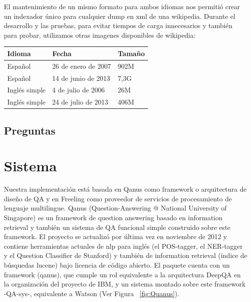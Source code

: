 El mantenimiento de un mismo formato para ambos idiomas nos permitió crear un indexador único para cualquier
dump en xml de una wikipedia. Durante el desarrollo y las pruebas, para evitar tiempos de carga innecesarios y también
para probar, utilizamos otras imagenes disponibles de wikipedia:

\medskip

\begin{center}
\begin{tabular}{ | l | l | l |}
    \hline
    Idioma & Fecha & Tamaño\\ \hline
    Español & 26 de enero de 2007 & 902M \\ \hline
    Español & 14 de junio de 2013 & 7,3G \\ \hline
    Inglés simple & 4 de julio de 2006 & 26M \\ \hline
    Inglés simple & 24 de julio de 2013 & 406M \\ \hline
 \end{tabular}
\end{center}

\subsection{Preguntas}

\section{Sistema}
\label{sec:sistema}
Nuestra implementación está basada en Qanus como framework o arquitectura de diseño de QA y en Freeling como proveedor de servicios de procesamiento de lenguaje multilingue. Qanus (Question-Answering @ National University of Singapore) es un framework de question answering basado en information retrieval y también un sistema de QA funcional simple construido sobre este framework. El proyecto se actualizó por última vez en noviembre de 2012 y contiene herramientas actuales de nlp para inglés (el POS-tagger, el NER-tagger y el Question Classifier de Stanford) y también de information retrieval (índice de búsquedas lucene) bajo licencia de código abierto. El paquete cuenta con un framework (qanus), que cumple un rol equivalente a la arquitectura DeepQA en la organización del proyecto de IBM, y un sistema montado sobre este framework -QA-sys-, equivalente a Watson (Ver Figura ~\ref{fig:Quanus}). 


